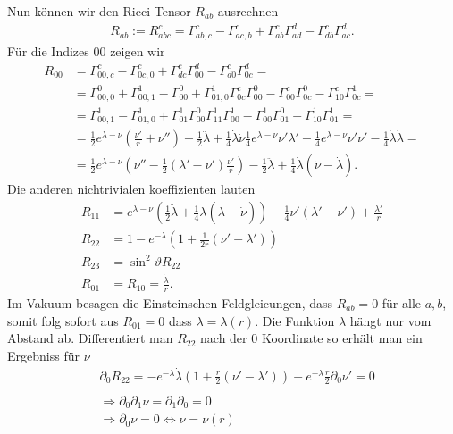 \documentclass[a4paper]{article}
\begin{document}
Nun können wir den Ricci Tensor $R_{ab}$ ausrechnen
\begin{align}
    R_{ab}:=R^c_{abc}  = \Gamma^c_{ab,c}-\Gamma^c_{ac, b} + \Gamma^c_{ab}
    \Gamma^d_{ad} -\Gamma^c_{db}\Gamma^d_{ac}.
\end{align}
Für die Indizes $00$ zeigen wir
\begin{align}
    R_{00} &= \Gamma^c_{00,c} - \Gamma^c_{0c,0}+\Gamma^c_{dc}\Gamma^d_{00} -
    \Gamma^c_{d0}\Gamma^d_{0c} =\\
    &=\Gamma^0_{00,0} + \Gamma^1_{00,1} - \Gamma^0_{00} + \Gamma^1_{01,0}
    \Gamma^c_{0c}\Gamma^{0}_{00} - \Gamma^c_{00}\Gamma^0_{0c} - \Gamma^c_{10}
    \Gamma^1_{0c} =\\
    &= \Gamma^1_{00,1} - \Gamma^1_{01,0} + \Gamma^1_{01}\Gamma^0_{00}
    \Gamma^1_{11}\Gamma^1_{00} - \Gamma^1_{00}\Gamma^0_{01} - \Gamma^1_{10}
    \Gamma^1_{01} = \\
    &=\frac{1}{2}e^{\lambda-\nu}(\frac{\nu'}{r} + \nu'')
    -\frac{1}{2}\ddot{\lambda} + \frac{1}{4} \dot{\lambda}\dot{\nu}
    \frac{1}{4}e^{\lambda-\nu} \nu'\lambda' - \frac{1}{4}e^{\lambda-\nu}
    \nu'\nu' - \frac{1}{4} \dot{\lambda}\dot{\lambda} = \\
    &=\frac{1}{2} e^{\lambda -\nu} ( \nu'' -\frac{1}{2}(\lambda' - \nu')
    \frac{\nu'}{r}) -\frac{1}{2} \ddot{\lambda} + \frac{1}{4}\dot{\lambda}(
    \dot{\nu} - \dot{\lambda}).
\end{align}
Die anderen nichtrivialen koeffizienten lauten
\begin{align}
    R_{11} &= e^{\lambda-\nu}
    (\frac{1}{2}\ddot{\lambda}+\frac{1}{4}\dot{\lambda}(\dot{\lambda}-
    \dot{\nu}))
    -\frac{1}{4} \nu'(\lambda' - \nu') + \frac{\lambda'}{r}\\
    R_{22} &= 1-e^{-\lambda}(1+\frac{1}{2r} (\nu'-\lambda'))\\
    R_{23} &= \sin^2\vartheta R_{22}\\
    R_{01} &= R_{10} = \frac{\dot{\lambda}}{r}.
\end{align}
Im Vakuum besagen die Einsteinschen Feldgleicungen, dass $R_{ab} = 0$ für
alle $a, b$, somit folg sofort aus $R_{01} = 0$ dass $\lambda = \lambda(r)$.
Die Funktion $\lambda$ hängt nur vom Abstand ab. Differentiert man $R_{22}$
nach der $0$ Koordinate so erhält man ein Ergebniss für $\nu$
\begin{align}
    &\partial_0 R_{22} = -e^{-\lambda} \dot{\lambda} ( 1+ \frac{r}{2}(\nu' -
    \lambda')) + e^{-\lambda} \frac{r}{2}\partial_0 \nu' = 0\\
    \nonumber\\
    &\Rightarrow \partial_0\partial_1 \nu = \partial_1\partial_0 = 0\\
    &\Rightarrow \partial_0 \nu =0 \Leftrightarrow \nu = \nu(r)
\end{align}
\end{document}
